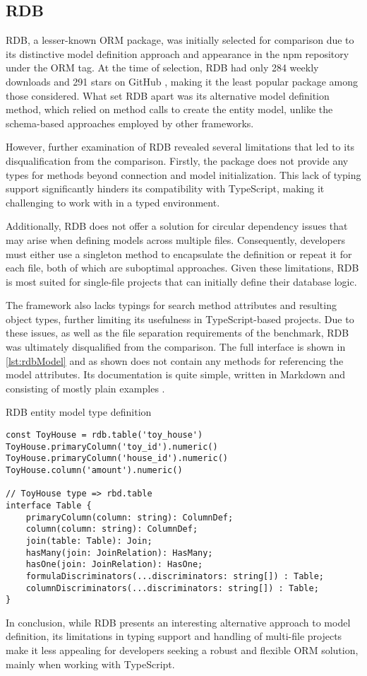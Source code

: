 \subsection{RDB}

RDB, a lesser-known ORM package, was initially selected for comparison due to
its distinctive model definition approach and appearance in the npm repository
under the ORM tag. At the time of selection, RDB had only 284 weekly downloads
\cite{rdbNpm} and 291 stars on GitHub \cite{rdbGitHub}, making it the least
popular package among those considered. What set RDB apart was its alternative
model definition method, which relied on method calls to create the entity
model, unlike the schema-based approaches employed by other frameworks.

However, further examination of RDB revealed several limitations that led to its
disqualification from the comparison. Firstly, the package does not provide any
types for methods beyond connection and model initialization. This lack of
typing support significantly hinders its compatibility with TypeScript, making
it challenging to work with in a typed environment.

Additionally, RDB does not offer a solution for circular dependency issues that
may arise when defining models across multiple files. Consequently, developers
must either use a singleton method to encapsulate the definition or repeat it
for each file, both of which are suboptimal approaches. Given these limitations,
RDB is most suited for single-file projects that can initially define their
database logic.

The framework also lacks typings for search method attributes and resulting
object types, further limiting its usefulness in TypeScript-based projects. Due
to these issues, as well as the file separation requirements of the benchmark,
RDB was ultimately disqualified from the comparison. The full interface is shown
in \autoref{lst:rdbModel} and as shown does not contain any methods for
referencing the model attributes. Its documentation is quite simple, written in
Markdown and consisting of mostly plain examples \cite{rdbDocs}.

\begin{listing}
\caption{RDB entity model type definition}
\label{lst:rdbModel}
\begin{verbatim}
const ToyHouse = rdb.table('toy_house')
ToyHouse.primaryColumn('toy_id').numeric()
ToyHouse.primaryColumn('house_id').numeric()
ToyHouse.column('amount').numeric()

// ToyHouse type => rbd.table
interface Table {
    primaryColumn(column: string): ColumnDef;
    column(column: string): ColumnDef;
    join(table: Table): Join;
    hasMany(join: JoinRelation): HasMany;
    hasOne(join: JoinRelation): HasOne;
    formulaDiscriminators(...discriminators: string[]) : Table;
    columnDiscriminators(...discriminators: string[]) : Table;
}
\end{verbatim}
\end{listing}

In conclusion, while RDB presents an interesting alternative approach to model
definition, its limitations in typing support and handling of multi-file
projects make it less appealing for developers seeking a robust and flexible ORM
solution, mainly when working with TypeScript.